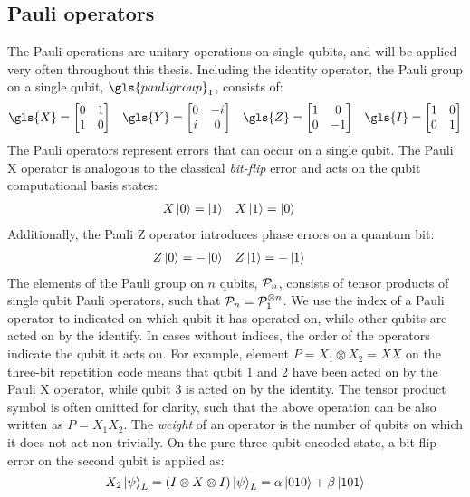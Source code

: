 \subsection{Pauli operators}\label{subsec:pauli}

The Pauli operations are unitary operations on single qubits, and will be applied very often throughout this thesis. Including the identity operator, the Pauli group on a single qubit, $\gls{pauligroup}_1$, consists of:
\begin{align}
  \gls{X} = \begin{bmatrix} 0 & 1 \\ 1 & 0 \end{bmatrix} &&
  \gls{Y} = \begin{bmatrix} 0 & -i \\ i & 0 \end{bmatrix} &&
  \gls{Z} = \begin{bmatrix} 1 & 0 \\ 0 & -1 \end{bmatrix} &&
  \gls{I} = \begin{bmatrix} 1 & 0 \\ 0 & 1 \end{bmatrix}
\end{align}
The Pauli operators represent errors that can occur on a single qubit. The Pauli X operator is analogous to the classical \emph{bit-flip} error and acts on the qubit computational basis states:
\begin{align}\label{eqq:qec_bitflip}
  & X\ket{0} = \ket{1} && X\ket{1} = \ket{0} &
\end{align}
Additionally, the Pauli Z operator introduces phase errors on a quantum bit:
\begin{align}\label{eq:eqc_phaseflip}
  & Z\ket{0} = -\ket{0} && Z\ket{1} = -\ket{1} &
\end{align}
The elements of the Pauli group on $n$ qubits, $\mathcal{P}_n$, consists of tensor products of single qubit Pauli operators, such that  $\mathcal{P}_n = \mathcal{P}_1^{\otimes n}$. We use the index of a Pauli operator to indicated on which qubit it has operated on, while other qubits are acted on by the identify. In cases without indices, the order of the operators indicate the qubit it acts on. For example, element $P=X_1\otimes X_2 = XX$ on the three-bit repetition code means that qubit 1 and 2 have been acted on by the Pauli X operator, while qubit 3 is acted on by the identity. The tensor product symbol is often omitted for clarity, such that the above operation can be also written as  $P=X_1X_2$. The \emph{weight} of an operator is the number of qubits on which it does not act non-trivially. On the pure  three-qubit encoded state, a bit-flip error on the second qubit is applied as:
\begin{equation}\label{eq:qec_3bitflip}
  X_2\ket{\psi}_L = (I\otimes X \otimes I) \ket{\psi}_L = \alpha\ket{010} + \beta\ket{101}
\end{equation}

